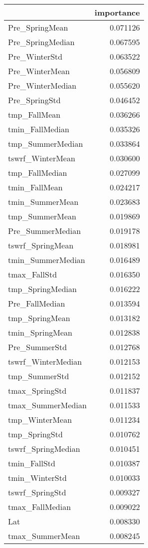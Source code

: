 \begin{tabular}{lr}
\toprule
 & importance \\
\midrule
Pre_SpringMean & 0.071126 \\
Pre_SpringMedian & 0.067595 \\
Pre_WinterStd & 0.063522 \\
Pre_WinterMean & 0.056809 \\
Pre_WinterMedian & 0.055620 \\
Pre_SpringStd & 0.046452 \\
tmp_FallMean & 0.036266 \\
tmin_FallMedian & 0.035326 \\
tmp_SummerMedian & 0.033864 \\
tswrf_WinterMean & 0.030600 \\
tmp_FallMedian & 0.027099 \\
tmin_FallMean & 0.024217 \\
tmin_SummerMean & 0.023683 \\
tmp_SummerMean & 0.019869 \\
Pre_SummerMedian & 0.019178 \\
tswrf_SpringMean & 0.018981 \\
tmin_SummerMedian & 0.016489 \\
tmax_FallStd & 0.016350 \\
tmp_SpringMedian & 0.016222 \\
Pre_FallMedian & 0.013594 \\
tmp_SpringMean & 0.013182 \\
tmin_SpringMean & 0.012838 \\
Pre_SummerStd & 0.012768 \\
tswrf_WinterMedian & 0.012153 \\
tmp_SummerStd & 0.012152 \\
tmax_SpringStd & 0.011837 \\
tmax_SummerMedian & 0.011533 \\
tmp_WinterMean & 0.011234 \\
tmp_SpringStd & 0.010762 \\
tswrf_SpringMedian & 0.010451 \\
tmin_FallStd & 0.010387 \\
tmin_WinterStd & 0.010033 \\
tswrf_SpringStd & 0.009327 \\
tmax_FallMedian & 0.009022 \\
Lat & 0.008330 \\
tmax_SummerMean & 0.008245 \\

\end{tabular}
